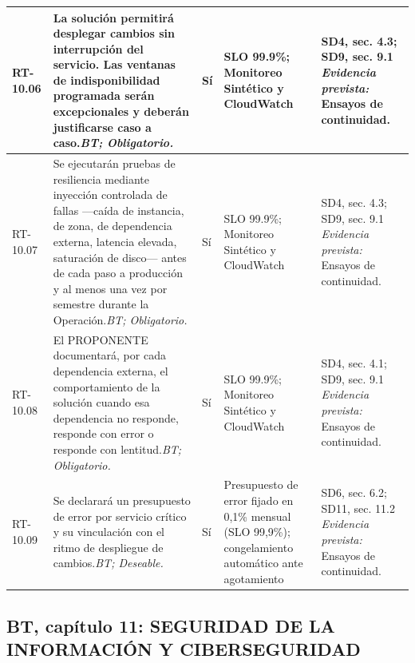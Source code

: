\begin{paginaHorizontalSynaptix}
\begin{longtable}{|L{0.09\AnchoMatrizTDoce}|L{0.385\AnchoMatrizTDoce}|L{0.065\AnchoMatrizTDoce}|L{0.18\AnchoMatrizTDoce}|L{0.28\AnchoMatrizTDoce}|}
RT-\allowbreak{}10.\allowbreak{}06 &
La solución permitirá desplegar cambios sin interrupción del servicio. Las ventanas de indisponibilidad programada serán excepcionales y deberán justificarse caso a caso.\newline\textit{BT; Obligatorio.} &
Sí &
SLO 99.9\%; Monitoreo Sintético y CloudWatch &
SD4, sec. 4.3; SD9, sec. 9.1 \newline\textit{Evidencia prevista:} Ensayos de continuidad. \\ \hline

RT-\allowbreak{}10.\allowbreak{}07 &
Se ejecutarán pruebas de resiliencia mediante inyección controlada de fallas —caída de instancia, de zona, de dependencia externa, latencia elevada, saturación de disco— antes de cada paso a producción y al menos una vez por semestre durante la Operación.\newline\textit{BT; Obligatorio.} &
Sí &
SLO 99.9\%; Monitoreo Sintético y CloudWatch &
SD4, sec. 4.3; SD9, sec. 9.1 \newline\textit{Evidencia prevista:} Ensayos de continuidad. \\ \hline

RT-\allowbreak{}10.\allowbreak{}08 &
El PROPONENTE documentará, por cada dependencia externa, el comportamiento de la solución cuando esa dependencia no responde, responde con error o responde con lentitud.\newline\textit{BT; Obligatorio.} &
Sí &
SLO 99.9\%; Monitoreo Sintético y CloudWatch &
SD4, sec. 4.1; SD9, sec. 9.1 \newline\textit{Evidencia prevista:} Ensayos de continuidad. \\ \hline

RT-\allowbreak{}10.\allowbreak{}09 &
Se declarará un presupuesto de error por servicio crítico y su vinculación con el ritmo de despliegue de cambios.\newline\textit{BT; Deseable.} &
Sí &
Presupuesto de error fijado en 0,1\% mensual (SLO 99,9\%); congelamiento automático ante agotamiento &
SD6, sec. 6.2; SD11, sec. 11.2 \newline\textit{Evidencia prevista:} Ensayos de continuidad. \\ \hline

\end{longtable}


\subsection*{BT, capítulo 11: SEGURIDAD DE LA INFORMACIÓN Y CIBERSEGURIDAD}


\end{paginaHorizontalSynaptix}

